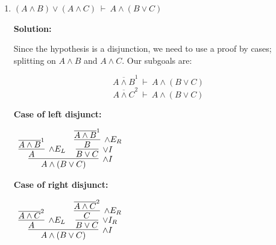 \documentclass[11pt]{report}
\newcommand{\temp}[2]{{\overline{#2}}^{#1}}
\begin{document}
\begin{enumerate}
\begin{enumerate}
		These subproofs come together with $\lor$-elimination to complete the proof: 

	\begin{scriptsize}
		\begin{center}
			$\begin{array}{c}
				\infer[\lor E]{(A \land B) \lor (A \land C)}
					{\infer[\land E_{R}]{B \lor C}{A \land (B \lor C)}
						&
					\infer[\to I, 1]{B \to ((A \land B) \lor (A \land C))}
						{\infer[\lor I_{L}]{(A \land B) \lor (A \land C)}{\infer[\land I]{A \land B}
								{\infer[\land E_{L}]{A}
									{A \land (B \lor C)}
							&
						\temp{1}{B}}}}
					&
					\infer[\to I,2]{C \to ((A \land B) \lor (A \land C))}{\infer[\lor I_{R}]{(A \land B) \lor (A \land C)}{\infer[\land I]{A \land C}
						{\infer[\land E_{L}]{A}{A \land (B \lor C)}
							&
						\temp{2}{C}}}}
						}
			\end{array}$
		\end{center}
	\end{scriptsize}
		
		\newpage
		\item $(A \land B) \lor (A \land C) \ \vdash \ A \land (B \lor C)$
		
		\textbf{Solution:}

		Since the hypothesis is a disjunction, we need to use a proof by cases; splitting on $A \land B$ and $A \land C$. Our subgoals are: 

		$$\temp{1}{A \land B} \ \vdash \ A \land (B \lor C) $$
		$$\temp{2}{A \land C} \ \vdash \ A \land (B \lor C) $$

		\textbf{Case of left disjunct:}

		\begin{center}
			$\begin{array}{c}
				\infer[\land I]{A \land (B \lor C)}
					{\infer[\land E_{L}]{A}{\temp{1}{A \land B}}
					&
					\infer[\lor I]{B \lor C}
						{\infer[\land E_{R}]{B}
							{\temp{1}{A \land B}}}}
			\end{array}$
		\end{center}


		\textbf{Case of right disjunct:}
		\begin{center}
			$\begin{array}{c}
				\infer[\land I]{A \land (B \lor C)}
					{\infer[\land E_{L}]{A}{\temp{2}{A \land C}}
					&
					\infer[\lor I_{R}]{B \lor C}
						{\infer[\land E_{R}]{C}
							{\temp{2}{A \land C}}}}
			\end{array}$
		\end{center}


\end{enumerate}
\end{enumerate}
\end{document}
